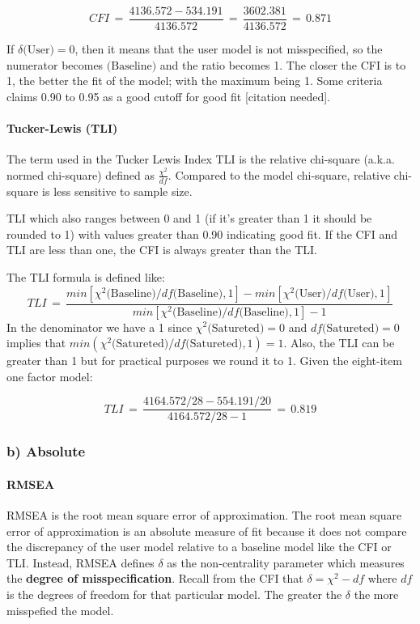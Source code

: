 \documentclass[
]{article}
\begin{document}
\[
CFI \, = \, \frac{4136.572-534.191}{4136.572} \, = \, \frac{3602.381}{4136.572} \, = \, 0.871
\]

If \(\delta \text{(User)}=0\), then it means that the user model is not
misspecified, so the numerator becomes \(\text{(Baseline)}\) and the
ratio becomes 1. The closer the CFI is to 1, the better the fit of the
model; with the maximum being 1. Some criteria claims 0.90 to 0.95 as a
good cutoff for good fit {[}citation needed{]}.

\hypertarget{tucker-lewis-tli}{%
\paragraph{Tucker-Lewis (TLI)}\label{tucker-lewis-tli}}

The term used in the Tucker Lewis Index TLI is the relative chi-square
(a.k.a. normed chi-square) defined as \(\frac{\chi^{2}}{df}\). Compared
to the model chi-square, relative chi-square is less sensitive to sample
size.

TLI which also ranges between 0 and 1 (if it's greater than 1 it should
be rounded to 1) with values greater than 0.90 indicating good fit. If
the CFI and TLI are less than one, the CFI is always greater than the
TLI.

The TLI formula is defined like: \[
TLI \, = \, \frac{min[\chi^2 \text{(Baseline)} / df \text{(Baseline)},1]-min[\chi^2 \text{(User)} / df  \text{(User)},1]}{min[\chi^2 \text{(Baseline)} / df \text{(Baseline)},1]-1}
\] In the denominator we have a 1 since \(\chi^2 \text{(Satureted)}=0\)
and \(df \text{(Satureted)}=0\) implies that
\(min(\chi^2 \text{(Satureted)}/df\text{(Satureted)},1)=1\). Also, the
TLI can be greater than 1 but for practical purposes we round it to 1.
Given the eight-item one factor model:

\[
TLI \, = \, \frac{4164.572/ 28-554.191 / 20}{4164.572 / 28-1} \, = \, 0.819
\]

\hypertarget{b-absolute}{%
\subsubsection{b) Absolute}\label{b-absolute}}

\hypertarget{rmsea}{%
\paragraph{RMSEA}\label{rmsea}}

RMSEA is the root mean square error of approximation. The root mean
square error of approximation is an absolute measure of fit because it
does not compare the discrepancy of the user model relative to a
baseline model like the CFI or TLI. Instead, RMSEA defines \(\delta\) as
the non-centrality parameter which measures the \textbf{degree of
misspecification}. Recall from the CFI that \(\delta=\chi^2-df\) where
\(df\) is the degrees of freedom for that particular model. The greater
the \(\delta\) the more misspefied the model.
\end{document}
